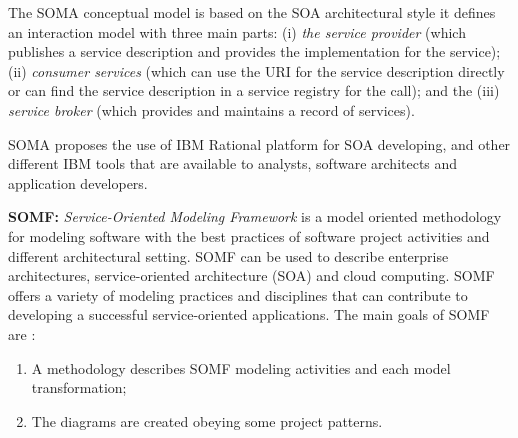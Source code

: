 % 
% 

The SOMA conceptual model is based on the SOA architectural style it
defines an interaction model with three main parts: (i) \textit{the service
provider} (which publishes a service description and provides the implementation for the
service); (ii) \textit{consumer services} (which can use the URI for the service
description directly or can find the service description in a service registry
for the call); and the (iii) \textit{service broker} (which provides and
maintains a record of services).

SOMA proposes the use of IBM Rational platform for SOA developing, and other
different IBM tools that are available to analysts, software architects and
application developers. 


\bigskip

\textbf{SOMF:} \textit{Service-Oriented Modeling Framework} \cite{somf} is a 
model oriented methodology for modeling software with the best practices of
software project activities and different architectural setting. SOMF can be
used to describe enterprise architectures, service-oriented architecture (SOA)
and cloud computing. SOMF offers a variety of modeling practices and disciplines
that can contribute to developing a successful service-oriented applications. 
The main goals of SOMF are \cite{somf}:
      


\begin{enumerate}
  \item A methodology describes SOMF modeling
  activities and each model transformation;
  \item The diagrams are created obeying some project
  patterns.
\end{enumerate}

